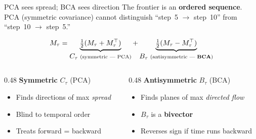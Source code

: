 \documentclass[aspectratio=169, 11pt]{beamer}
\begin{document}
\begin{frame}{PCA sees spread; BCA sees direction}
\vspace{-0.3em}
{\small The frontier is an \textbf{ordered sequence}.
PCA (symmetric covariance) cannot distinguish ``step~5 $\to$ step~10'' from ``step~10 $\to$ step~5.''}

\vspace{-0.2em}
\[
  M_\tau = \underbrace{\tfrac{1}{2}(M_\tau + M_\tau^\top)}_{\displaystyle C_\tau
    \;\text{\scriptsize(symmetric --- PCA)}}
  + \underbrace{\tfrac{1}{2}(M_\tau - M_\tau^\top)}_{\displaystyle B_\tau
    \;\text{\scriptsize(antisymmetric --- \textbf{BCA})}}
\]

\vspace{-0.5em}
\begin{columns}[T]
\begin{column}{0.48\textwidth}
\textbf{Symmetric} $C_\tau$ (PCA)
\begin{itemize}\small\setlength{\itemsep}{1pt}
  \item Finds directions of max \emph{spread}
  \item Blind to temporal order
  \item Treats forward = backward
\end{itemize}
\end{column}
\begin{column}{0.48\textwidth}
\textbf{Antisymmetric} $B_\tau$ (BCA)
\begin{itemize}\small\setlength{\itemsep}{1pt}
  \item Finds planes of max \emph{directed flow}
  \item $B_\tau$ is a \textbf{bivector}
  \item Reverses sign if time runs backward
\end{itemize}
\end{column}
\end{columns}

\vspace{0.4em}
\begin{center}
\end{center}
\end{frame}
\end{document}
